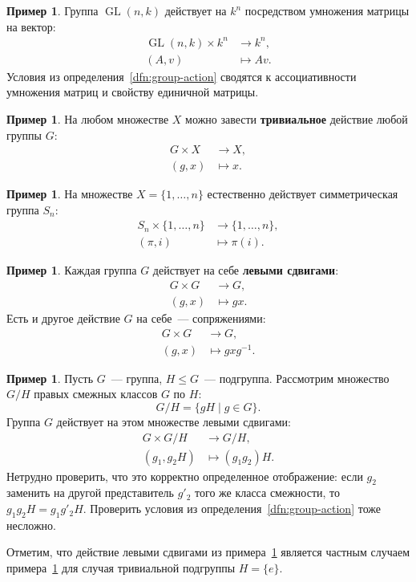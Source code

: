 \documentclass[a4paper,11pt]{scrartcl}
\theoremstyle{plain}
\theoremstyle{definition}
\newtheorem{example}[theorem]{Пример}
\newcommand\dfn[1]{\textbf{#1}}
\newcommand\GL{\operatorname{GL}}
\begin{document}
\begin{example}
Группа $\GL(n,k)$ действует на $k^n$ посредством умножения
матрицы на вектор:
\begin{align*}
\GL(n,k) \times k^n & \to k^n,\\
(A,v) & \mapsto Av.
\end{align*}
Условия из определения~\ref{dfn:group-action} сводятся к ассоциативности
умножения матриц и свойству единичной матрицы.
\end{example}

\begin{example}
На любом множестве $X$ можно завести \dfn{тривиальное} действие
любой группы $G$:
\begin{align*}
G\times X & \to X, \\
(g,x) & \mapsto x.
\end{align*}
\end{example}

\begin{example}
На множестве $X = \{1,\dots,n\}$ естественно действует
симметрическая группа $S_n$:
\begin{align*}
S_n \times \{1,\dots,n\} & \to \{1,\dots,n\}, \\
(\pi,i) & \mapsto \pi(i).
\end{align*}
\end{example}

\begin{example}\label{example:left-multiplication-action}
Каждая группа $G$ действует на себе \dfn{левыми сдвигами}:
\begin{align*}
G\times G & \to G,\\
(g,x) & \mapsto gx.
\end{align*}
Есть и другое действие $G$ на себе~--- сопряжениями:
\begin{align*}
G\times G & \to G,\\
(g,x) & \mapsto gxg^{-1}.
\end{align*}
\end{example}

\begin{example}\label{example:action-on-cosets}
Пусть $G$~--- группа, $H\leq G$~--- подгруппа.
Рассмотрим множество $G/H$ правых смежных классов $G$ по $H$:
$$
G/H = \{gH\mid g\in G\}.
$$
Группа $G$ действует на этом множестве левыми сдвигами:
\begin{align*}
G\times G/H & \to G/H, \\
(g_1, g_2H) & \mapsto (g_1g_2)H.
\end{align*}
Нетрудно проверить, что это корректно определенное отображение:
если $g_2$ заменить на другой представитель $g'_2$ того же класса смежности,
то $g_1g_2H = g_1g'_2H$.
Проверить условия из определения~\ref{dfn:group-action} тоже несложно.
\end{example}
Отметим, что действие левыми сдвигами
из примера~\ref{example:left-multiplication-action} является частным случаем
примера~\ref{example:action-on-cosets} для случая тривиальной
подгруппы $H = \{e\}$.
\end{document}
